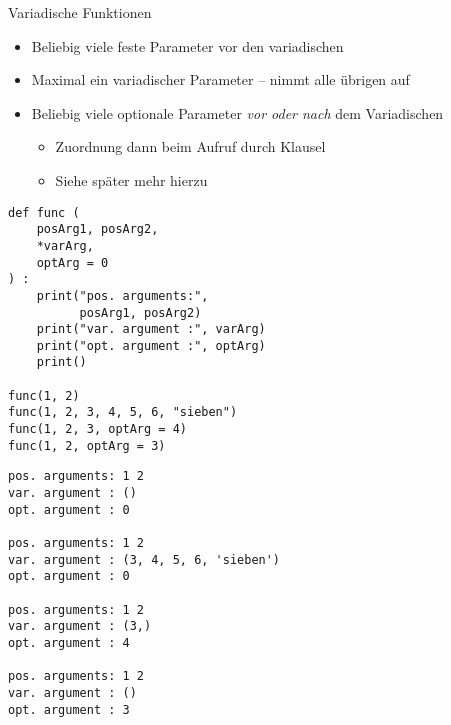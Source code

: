 
\begin{frame}{Variadische Funktionen}
%
\begin{itemize}
\item Beliebig viele feste Parameter vor den variadischen
\item Maximal ein variadischer Parameter -- nimmt alle übrigen auf
\item Beliebig viele optionale Parameter \emph{vor oder nach} dem Variadischen
	\begin{itemize}
	\item Zuordnung dann beim Aufruf durch Klausel 
	\item Siehe später mehr hierzu
	\end{itemize}
\end{itemize}
%
\end{frame}


\begin{frame}[fragile]
%
\begin{tcbraster}[raster columns=2,
                  raster equal height,
                  nobeforeafter,
                  raster column skip=0.5cm]
\begin{codebox}
\begin{verbatim}
def func (
    posArg1, posArg2,
    *varArg,
    optArg = 0
) :
    print("pos. arguments:",
          posArg1, posArg2)
    print("var. argument :", varArg)
    print("opt. argument :", optArg)
    print()

func(1, 2)
func(1, 2, 3, 4, 5, 6, "sieben")
func(1, 2, 3, optArg = 4)
func(1, 2, optArg = 3)
\end{verbatim}
\end{codebox}
%
\begin{cmdbox}
\begin{verbatim}
pos. arguments: 1 2
var. argument : ()
opt. argument : 0

pos. arguments: 1 2
var. argument : (3, 4, 5, 6, 'sieben')
opt. argument : 0

pos. arguments: 1 2
var. argument : (3,)
opt. argument : 4

pos. arguments: 1 2
var. argument : ()
opt. argument : 3
\end{verbatim}
\end{cmdbox}
\end{tcbraster}
%
\end{frame}

